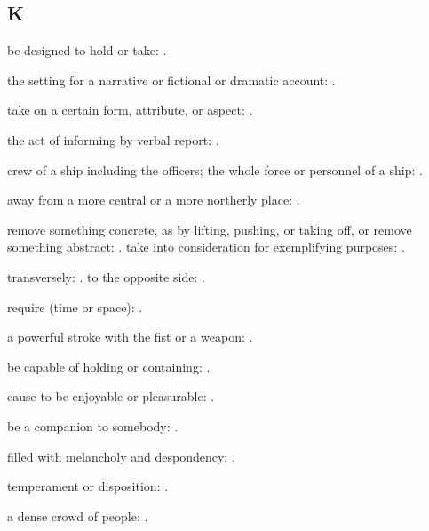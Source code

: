 \subsection*{K}

  be designed to hold or take:   .

  the setting for a narrative or fictional or dramatic account:   .

  take on a certain form, attribute, or aspect:   .

  the act of informing by verbal report:   .

  crew of a ship including the officers; the whole force or personnel of a ship:   .

  away from a more central or a more northerly place: .

  remove something concrete, as by lifting, pushing, or taking off, or remove something abstract:   . take into consideration for exemplifying purposes:   .

  transversely:   . to the opposite side: .

  require (time or space):   .

  a powerful stroke with the fist or a weapon: .

  be capable of holding or containing:   .

  cause to be enjoyable or pleasurable: .

  be a companion to somebody:   .

  filled with melancholy and despondency:   .

  temperament or disposition: .

  a dense crowd of people:   .

